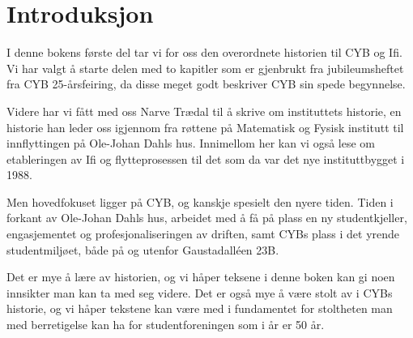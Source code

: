 \chapter*{Introduksjon}

\setcounter{footnote}{0}

I denne bokens første del tar vi for oss den overordnete historien til CYB og Ifi. Vi har valgt å starte delen med to kapitler som er gjenbrukt fra jubileumsheftet fra CYB 25-årsfeiring, da disse meget godt beskriver CYB sin spede begynnelse.

Videre har vi fått med oss Narve Trædal til å skrive om instituttets historie, en historie han leder oss igjennom fra røttene på Matematisk og Fysisk institutt til innflyttingen på Ole-Johan Dahls hus. Innimellom her kan vi også lese om etableringen av Ifi og flytteprosessen til det som da var det nye instituttbygget i 1988.

Men hovedfokuset ligger på CYB, og kanskje spesielt den nyere tiden. Tiden i forkant av Ole-Johan Dahls hus, arbeidet med å få på plass en ny studentkjeller, engasjementet og profesjonaliseringen av driften, samt CYBs plass i det yrende studentmiljøet, både på og utenfor Gaustadalléen 23B.

Det er mye å lære av historien, og vi håper teksene i denne boken kan gi noen innsikter man kan ta med seg videre. Det er også mye å være stolt av i CYBs historie, og vi håper tekstene kan være med i fundamentet for stoltheten man med berretigelse kan ha for studentforeningen som i år er 50 år.